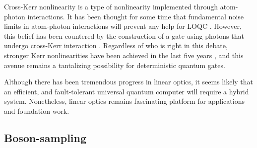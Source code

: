 \documentclass[times,final]{elsarticle}
\begin{document}
Cross-Kerr nonlinearity is a type of nonlinearity implemented through 
 atom-photon interactions. It has been thought for some time that fundamental noise limits in atom-photon interactions will prevent any help for LOQC \cite{bib:Shapiro06,bib:Shapiro07,bib:Gea-Banacloche10}. However, this belief has been countered by the construction of a {} gate using photons that undergo cross-Kerr interaction \cite{bib:Brod16}. Regardless of who is right in this debate, stronger Kerr nonlinearities have been achieved in the last 
 five years \cite{bib:Hoi13,bib:Venkataraman13,bib:Feizpour15,bib:Beck16}, 
 and this avenue remains a tantalizing possibility for deterministic 
 quantum gates.
 
  
  Although there has been tremendous progress in linear optics, it seems likely that an efficient, and fault-tolerant universal quantum computer will require a hybrid system. Nonetheless, linear optics remains fascinating platform for applications and foundation work.

 
\subsection{Boson-sampling}\label{sec:bosonsampling}
\end{document}
